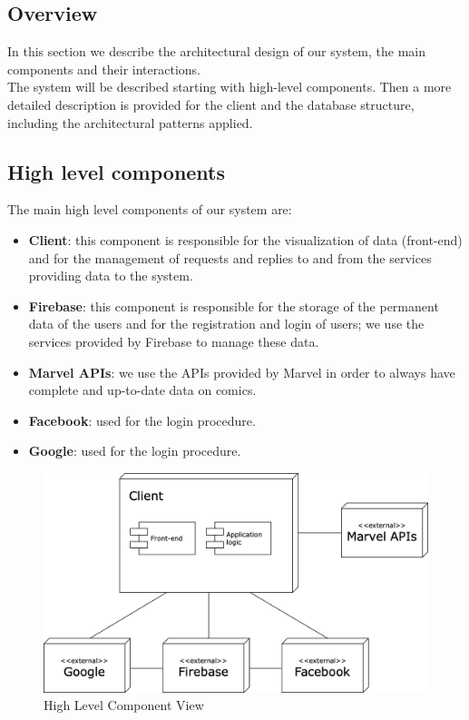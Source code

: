 \subsection{Overview}
In this section we describe the architectural design of our system, the main components and their interactions. \\
The system will be described starting with high-level components. Then a more detailed description is provided for the client and the database structure, including the architectural patterns applied.

\subsection{High level components}
The main high level components of our system are:
\begin{itemize}
\item {\textbf{Client}}: this component is responsible for the visualization of data (front-end) and for the management of requests and replies to and from the services providing data to the system.
\item {\textbf{Firebase}}: this component is responsible for the storage of the permanent data of the users and for the registration and login of users; we use the services provided by Firebase to manage these data.
\item {\textbf{Marvel APIs}}: we use the APIs provided by Marvel in order to always have complete and up-to-date data on comics.
\item {\textbf{Facebook}}: used for the login procedure.
\item {\textbf{Google}}: used for the login procedure.
\end{itemize}

\vspace{3mm}

\begin{figure}[h]
\centering
\includegraphics[width=\textwidth]{img/components}
\caption{High Level Component View}
\end{figure}

